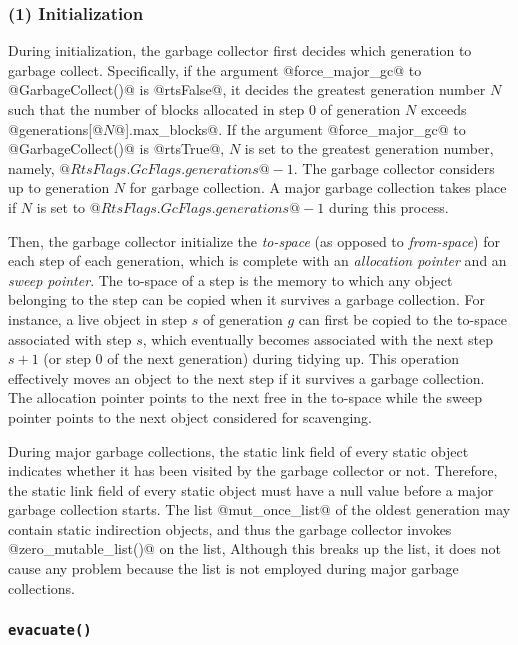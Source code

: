 \documentclass{article}
\begin{document}
\subsubsection{(1) Initialization}

During initialization, the garbage collector first decides which generation
to garbage collect.
Specifically, 
if the argument @force_major_gc@ to @GarbageCollect()@ is @rtsFalse@,
it decides the greatest generation number $N$ such
that the number of blocks allocated in step $0$ of generation $N$ exceeds
@generations[@$N$@].max_blocks@. 
If the argument @force_major_gc@ to @GarbageCollect()@ is @rtsTrue@,
$N$ is set to the greatest generation number, namely, 
$@RtsFlags.GcFlags.generations@ - 1$.
The garbage collector considers up to generation $N$ for garbage collection.
A major garbage collection takes place if $N$ is set to 
$@RtsFlags.GcFlags.generations@ - 1$ during this process.

Then, the garbage collector initialize the \emph{to-space} (as opposed to
\emph{from-space}) for each step of 
each generation, which is complete with an \emph{allocation pointer} and
an \emph{sweep pointer}.
The to-space of a step is the memory to which any object belonging to the
step can be copied when it survives a garbage collection.
For instance, a live object in step $s$ of generation $g$ can first be copied
to the to-space associated with step $s$, which eventually becomes 
associated with the next step $s + 1$ (or step $0$ of the next generation)
during tidying up.
This operation effectively moves an object to the next step if it survives
a garbage collection. 
The allocation pointer points to the next free in the to-space while 
the sweep pointer points to the next object considered for scavenging.

During major garbage collections,
the static link field of every static object indicates whether it has
been visited by the garbage collector or not.
Therefore, the static link field of every static object must have
a null value before a major garbage collection starts. 
The list @mut_once_list@ of the oldest generation may contain static 
indirection objects, and thus 
the garbage collector invokes @zero_mutable_list()@ on the list,
Although this breaks up the list, it does not cause any problem because 
the list is not employed during major garbage collections.

\subsubsection{\tt evacuate()}
\end{document}
